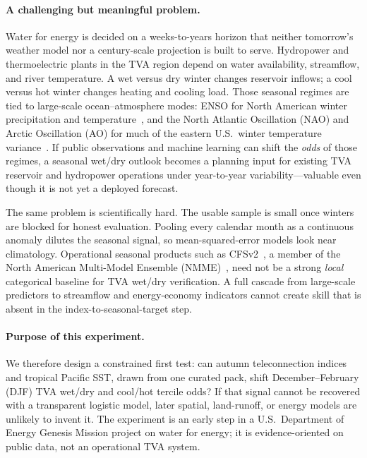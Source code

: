 \documentclass{article}
\begin{document}
\paragraph{A challenging but meaningful problem.}
Water for energy is decided on a weeks-to-years horizon that neither tomorrow's weather model nor a century-scale projection is built to serve.
Hydropower and thermoelectric plants in the TVA region depend on water availability, streamflow, and river temperature.
A wet versus dry winter changes reservoir inflows; a cool versus hot winter changes heating and cooling load.
Those seasonal regimes are tied to large-scale ocean--atmosphere modes: ENSO for North American winter precipitation and temperature~\citep{ropelewski1986enso,kurtzman2007enso}, and the North Atlantic Oscillation (NAO) and Arctic Oscillation (AO) for much of the eastern U.S.\ winter temperature variance~\citep{hurrell1995nao,thompson1998ao}.
If public observations and machine learning can shift the \emph{odds} of those regimes, a seasonal wet/dry outlook becomes a planning input for existing TVA reservoir and hydropower operations under year-to-year variability---valuable even though it is not yet a deployed forecast.

The same problem is scientifically hard.
The usable sample is small once winters are blocked for honest evaluation.
Pooling every calendar month as a continuous anomaly dilutes the seasonal signal, so mean-squared-error models look near climatology.
Operational seasonal products such as CFSv2~\citep{saha2014cfsv2}, a member of the North American Multi-Model Ensemble (NMME)~\citep{kirtman2014nmme}, need not be a strong \emph{local} categorical baseline for TVA wet/dry verification.
A full cascade from large-scale predictors to streamflow and energy-economy indicators cannot create skill that is absent in the index-to-seasonal-target step.

\paragraph{Purpose of this experiment.}
We therefore design a constrained first test: can autumn teleconnection indices and tropical Pacific SST, drawn from one curated pack, shift December--February (DJF) TVA wet/dry and cool/hot tercile odds?
If that signal cannot be recovered with a transparent logistic model, later spatial, land-runoff, or energy models are unlikely to invent it.
The experiment is an early step in a U.S.\ Department of Energy Genesis Mission project on water for energy; it is evidence-oriented on public data, not an operational TVA system.
\end{document}
